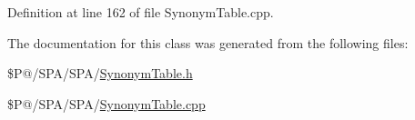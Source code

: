 Definition at line 162 of file Synonym\-Table.\-cpp.



The documentation for this class was generated from the following files\-:\begin{DoxyCompactItemize}
\item 
\$\-P@/\-S\-P\-A/\-S\-P\-A/\hyperlink{_synonym_table_8h}{Synonym\-Table.\-h}\item 
\$\-P@/\-S\-P\-A/\-S\-P\-A/\hyperlink{_synonym_table_8cpp}{Synonym\-Table.\-cpp}\end{DoxyCompactItemize}
